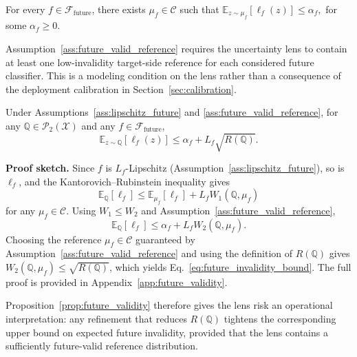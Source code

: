 \begin{assumption}
\label{ass:future_valid_reference}
For every $f\in\mathcal{F}_{\mathrm{future}}$, there exists
$\mu_f\in\mathcal{C}$ such that
$
    \mathbb{E}_{z\sim\mu_f}
    \left[
        \ell_f(z)
    \right]
    \leq
    \alpha_f,
    \label{eq:future_valid_reference}
$
for some $\alpha_f\geq0$.
\end{assumption}

Assumption~\ref{ass:future_valid_reference} requires the uncertainty lens
to contain at least one low-invalidity target-side reference for each
considered future classifier. This is a modeling condition on the lens
rather than a consequence of the deployment calibration in
Section~\ref{sec:calibration}.

\begin{proposition}
\label{prop:future_validity}
Under Assumptions~\ref{ass:lipschitz_future} and
\ref{ass:future_valid_reference}, for any
$\mathbb{Q}\in\mathcal{P}_2(\mathcal{X})$ and any
$f\in\mathcal{F}_{\mathrm{future}}$,
\begin{equation}
    \mathbb{E}_{z\sim\mathbb{Q}}
    \left[
        \ell_f(z)
    \right]
    \leq
    \alpha_f
    +
    L_f\sqrt{R(\mathbb{Q})}.
    \label{eq:future_invalidity_bound}
\end{equation}
\end{proposition}

\textbf{Proof sketch.}
Since $f$ is $L_f$-Lipschitz
(Assumption~\ref{ass:lipschitz_future}), so is $\ell_f$, and the
Kantorovich--Rubinstein inequality gives
\[
    \mathbb{E}_{\mathbb{Q}}[\ell_f]
    \leq
    \mathbb{E}_{\mu_f}[\ell_f]
    +
    L_f W_1(\mathbb{Q},\mu_f)
\]
for any $\mu_f\in\mathcal{C}$.
Using $W_1\leq W_2$ and
Assumption~\ref{ass:future_valid_reference},
\[
    \mathbb{E}_{\mathbb{Q}}[\ell_f]
    \leq
    \alpha_f
    +
    L_f W_2(\mathbb{Q},\mu_f).
\]
Choosing the reference $\mu_f\in\mathcal{C}$ guaranteed by
Assumption~\ref{ass:future_valid_reference} and using the definition of
$R(\mathbb{Q})$ gives
$W_2(\mathbb{Q},\mu_f)\leq\sqrt{R(\mathbb{Q})}$, which yields
Eq.~\ref{eq:future_invalidity_bound}.
The full proof is provided in Appendix~\ref{app:future_validity}.

Proposition~\ref{prop:future_validity} therefore gives the lens risk an
operational interpretation: any refinement that reduces
$R(\mathbb{Q})$ tightens the corresponding upper bound on expected future
invalidity, provided that the lens contains a sufficiently future-valid
reference distribution.

